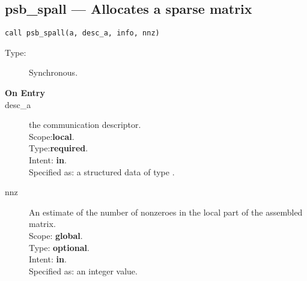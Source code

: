 


%
%
\clearpage\subsection*{psb\_spall --- Allocates a sparse matrix}

\begin{verbatim}
call psb_spall(a, desc_a, info, nnz)
\end{verbatim}

\begin{description}
\item[Type:] Synchronous.
\item[\bf On Entry]
\item[desc\_a] the communication descriptor.\\
Scope:{\bf local}.\\
Type:{\bf required}.\\
Intent: {\bf in}.\\
Specified as: a structured data of type \descdata.
\item[nnz] An estimate of the number of nonzeroes in the local
  part of the assembled matrix.\\ 
Scope: {\bf global}.\\
Type: {\bf optional}.\\
Intent: {\bf in}.\\
Specified as: an integer value. 
\end{description}

